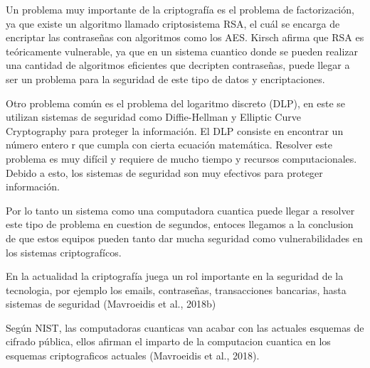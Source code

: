 \documentclass{article}
\begin{document}
Un problema muy importante de la criptografía es el problema de factorización, ya que existe un algoritmo llamado criptosistema RSA, el cuál se encarga de encriptar las contraseñas con algoritmos como los AES. Kirsch afirma que RSA es teóricamente vulnerable, ya que en un sistema cuantico donde se pueden realizar una cantidad de algoritmos eficientes que decripten contraseñas, puede llegar a ser un problema para la seguridad de este tipo de datos y encriptaciones.

Otro problema común es el problema del logaritmo discreto (DLP), en este se utilizan sistemas de seguridad como Diffie-Hellman y Elliptic Curve Cryptography para proteger la información. El DLP consiste en encontrar un número entero r que cumpla con cierta ecuación matemática. Resolver este problema es muy difícil y requiere de mucho tiempo y recursos computacionales. Debido a esto, los sistemas de seguridad son muy efectivos para proteger información.

Por lo tanto un sistema como una computadora cuantica puede llegar a resolver este tipo de problema en cuestion de segundos, entoces llegamos a la conclusion de que estos equipos pueden tanto dar mucha seguridad como vulnerabilidades en los sistemas criptografícos.

En la actualidad la criptografía juega un rol importante en la seguridad de la tecnologia, por ejemplo los emails, contraseñas, transacciones bancarias, hasta sistemas de seguridad (Mavroeidis et al., 2018b)

Según NIST, las computadoras cuanticas van acabar con las actuales esquemas de cifrado pública, ellos afirman el imparto de la computacion cuantica en los esquemas criptograficos actuales (Mavroeidis et al., 2018). 
\end{document}
